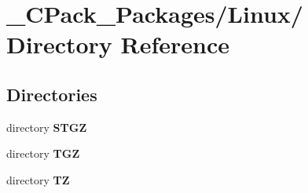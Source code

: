 \section{\_\-CPack\_\-Packages/Linux/ Directory Reference}
\label{dir_943db7d55acd1417e87da53057cf021e}
\subsection*{Directories}
\begin{DoxyCompactItemize}
\item 
directory {\bf STGZ}
\item 
directory {\bf TGZ}
\item 
directory {\bf TZ}
\end{DoxyCompactItemize}
